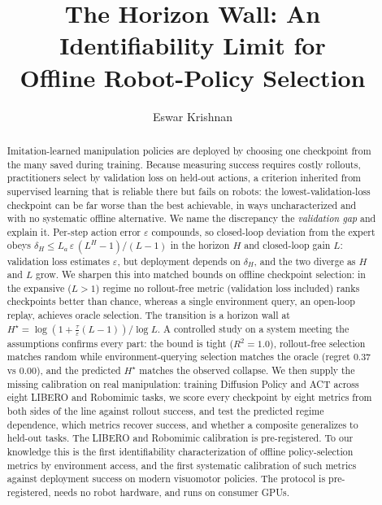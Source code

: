 \documentclass[11pt]{article}
\title{The Horizon Wall: An Identifiability Limit for\\ Offline Robot-Policy Selection}
\author{Eswar Krishnan}
\date{}
\begin{document}
\maketitle

\begin{abstract}
Imitation-learned manipulation policies are deployed by choosing one checkpoint from the many
saved during training. Because measuring success requires costly rollouts, practitioners select by
validation loss on held-out actions, a criterion inherited from supervised learning that is
reliable there but fails on robots: the lowest-validation-loss checkpoint can be far worse than the
best achievable, in ways uncharacterized and with no systematic offline alternative. We name the
discrepancy the \emph{validation gap} and explain it.
Per-step action error $\varepsilon$ compounds, so closed-loop deviation from the expert obeys
$\delta_H \le L_a\,\varepsilon\,(L^{H}-1)/(L-1)$ in the horizon $H$ and closed-loop gain $L$:
validation loss estimates $\varepsilon$, but deployment depends on $\delta_H$, and the two diverge
as $H$ and $L$ grow. We sharpen this into matched bounds on offline checkpoint
selection: in the expansive ($L>1$) regime no rollout-free metric (validation loss included) ranks
checkpoints better than chance, whereas a single environment query, an open-loop replay, achieves
oracle selection. The transition is a horizon wall at $H^\star=\log(1+\tfrac{\tau}{\varepsilon}(L-1))/\log L$.
A controlled study on a system meeting the assumptions confirms every part: the bound is tight
($R^2{=}1.0$), rollout-free selection matches random while environment-querying selection matches the
oracle (regret $0.37$ vs $0.00$), and the predicted $H^\star$ matches the observed collapse. We then
supply the missing calibration on real manipulation: training Diffusion Policy and ACT across eight
LIBERO and Robomimic tasks, we score every checkpoint by eight metrics from both sides of the line
against rollout success, and test the predicted regime dependence, which metrics recover success,
and whether a composite generalizes to held-out tasks. The LIBERO and Robomimic calibration is
pre-registered.
To our knowledge this is the first identifiability characterization of offline policy-selection
metrics by environment access, and the first systematic calibration of such metrics against
deployment success on modern visuomotor policies. The protocol is pre-registered, needs no robot
hardware, and runs on consumer GPUs.
\end{abstract}
\end{document}
